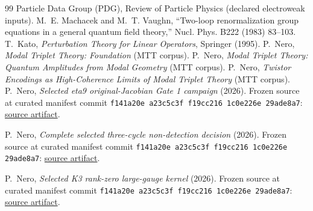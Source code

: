 \documentclass[11pt]{article}
\begin{document}
\begin{thebibliography}{99}
 Particle Data Group (PDG), Review of Particle Physics (declared electroweak inputs).
 M.~E. Machacek and M.~T. Vaughn, ``Two-loop renormalization group equations in a general quantum field theory,'' Nucl. Phys. B222 (1983) 83--103.
 T.~Kato, \emph{Perturbation Theory for Linear Operators}, Springer (1995).
 P.~Nero, \emph{Modal Triplet Theory: Foundation} (MTT corpus).
 P.~Nero, \emph{Modal Triplet Theory: Quantum Amplitudes from Modal Geometry} (MTT corpus).
 P.~Nero, \emph{Twistor Encodings as High-Coherence Limits of Modal Triplet Theory} (MTT corpus).
P.~Nero, \emph{Selected eta9 original-Jacobian Gate 1 campaign} (2026).
Frozen source at curated manifest commit
\texttt{f141a20e a23c5c3f f19cc216 1c0e226e 29ade8a7}:
\href{https://github.com/PeterNero/mtt-results-repro/blob/f141a20ea23c5c3ff19cc2161c0e226e29ade8a7/release/results/eta9_gate1_campaign/artifact.json}{source artifact}.

P.~Nero, \emph{Complete selected three-cycle non-detection decision} (2026).
Frozen source at curated manifest commit
\texttt{f141a20e a23c5c3f f19cc216 1c0e226e 29ade8a7}:
\href{https://github.com/PeterNero/mtt-results-repro/blob/f141a20ea23c5c3ff19cc2161c0e226e29ade8a7/release/results/eta9_three_cycle_b96_nondetection/artifact.json}{source artifact}.

P.~Nero, \emph{Selected K3 rank-zero large-gauge kernel} (2026).
Frozen source at curated manifest commit
\texttt{f141a20e a23c5c3f f19cc216 1c0e226e 29ade8a7}:
\href{https://github.com/PeterNero/mtt-results-repro/blob/f141a20ea23c5c3ff19cc2161c0e226e29ade8a7/release/results/q79_bk3_rank_zero_kernel/artifact.json}{source artifact}.

\end{thebibliography}
\end{document}
